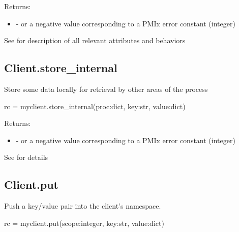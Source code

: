 Returns:

\begin{itemize}
    \item {} -  or a negative value corresponding to a PMIx error constant (integer)
\end{itemize}


See  for description of all relevant attributes and behaviors


\subsection{Client.store_internal}

\summary

Store some data locally for retrieval by other areas of the process

\format

\pyspecificstart
\begin{codepar}
rc = myclient.store_internal(proc:dict, key:str, value:dict)
\end{codepar}
\pyspecificend

\begin{arglist}
\end{arglist}

Returns:

\begin{itemize}
    \item {} -  or a negative value corresponding to a PMIx error constant (integer)
\end{itemize}


See  for details


\subsection{Client.put}

\summary

Push a key/value pair into the client's namespace.

\format

\pyspecificstart
\begin{codepar}
rc = myclient.put(scope:integer, key:str, value:dict)
\end{codepar}
\pyspecificend

